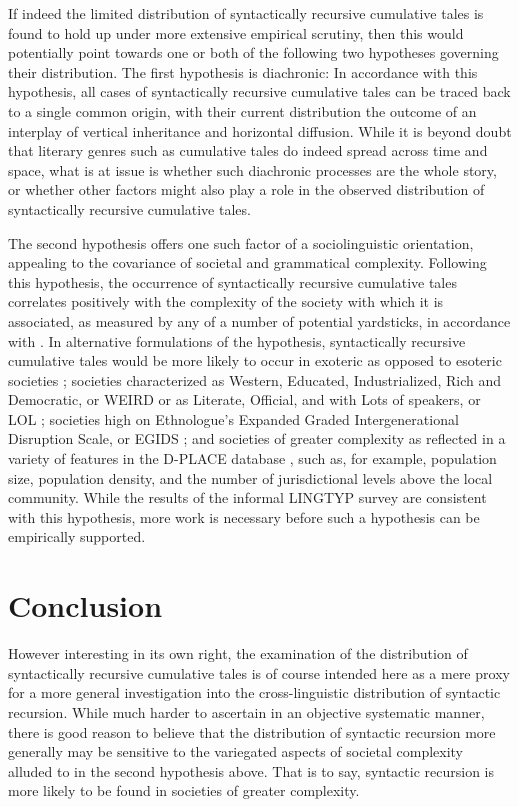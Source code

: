 \documentclass[output=paper,colorlinks,citecolor=brown
]{langscibook}
\begin{document}
If indeed the limited distribution of syntactically recursive cumulative tales is found to hold up under more extensive empirical scrutiny, then this would potentially point towards one or both of the following two hypotheses governing their distribution.  The first hypothesis is diachronic:  In accordance with this hypothesis, all cases of syntactically recursive cumulative tales can be traced back to a single common origin, with their current distribution the outcome of an interplay of vertical inheritance and horizontal diffusion.  While it is beyond doubt that literary genres such as cumulative tales do indeed spread across time and space, what is at issue is whether such diachronic processes are the whole story, or whether other factors might also play a role in the observed distribution of syntactically recursive cumulative tales.  

The second hypothesis offers one such factor of a sociolinguistic orientation, appealing to the covariance of societal and grammatical complexity.  Following this hypothesis, the occurrence of syntactically recursive cumulative tales correlates positively with the complexity of the society with which it is associated, as measured by any of a number of potential yardsticks, in accordance with \citet{chen2023linguistic}.  In alternative formulations of the hypothesis, syntactically recursive cumulative tales would be more likely to occur in exoteric as opposed to esoteric societies \citep{thurston1987processes, wray2007consequences}; societies characterized as Western, Educated, Industrialized, Rich and Democratic, or WEIRD \citep{henrich2010weirdest, henrich2020weirdest}  or as Literate, Official, and with Lots of speakers, or LOL \citep{dahl2015weird}; societies high on Ethnologue's Expanded Graded Intergenerational Disruption Scale, or EGIDS \citep{eberhard2020ethnologue}; and societies of greater complexity as reflected in a variety of features in the D-PLACE database \citep{kirby2016dplace}, such as, for example, population size, population density, and the number of jurisdictional levels above the local community.  While the results of the informal LINGTYP survey are consistent with this hypothesis, more work is necessary before such a hypothesis can be empirically supported.

\section{Conclusion}

However interesting in its own right, the examination of the distribution of syntactically recursive cumulative tales is of course intended here as a mere proxy for a more general investigation into the cross-linguistic distribution of syntactic recursion.  While much harder to ascertain in an objective systematic manner, there is good reason to believe that the distribution of syntactic recursion more generally may be sensitive to the variegated aspects of societal complexity alluded to in the second hypothesis above.  That is to say, syntactic recursion is more likely to be found in societies of greater complexity. 
\end{document}
